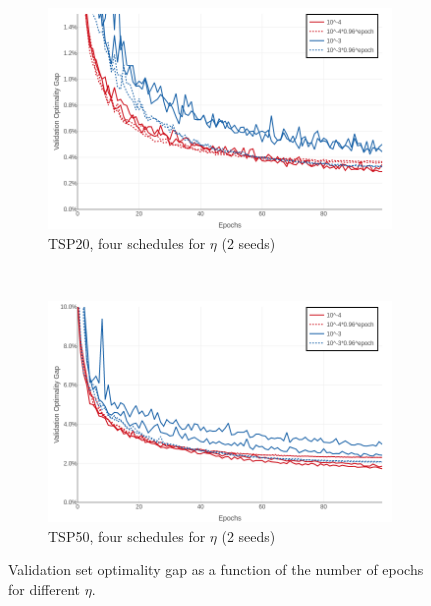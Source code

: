\begin{figure}
    \centering
    \begin{subfigure}[b]{0.49\linewidth}
        \centerline{\includegraphics[trim={0 0 0 0},clip,width=\linewidth]{./images/tsp20_learnrates}}
\caption{TSP20, four schedules for $\eta$ (2 seeds)}
\label{fig:tsp20_learnrates}
    \end{subfigure}
    ~
    \begin{subfigure}[b]{0.49\linewidth}
        \centerline{\includegraphics[trim={0 0 0 0},clip,width=\linewidth]{./images/tsp50_learnrates}}
\caption{TSP50, four schedules for $\eta$ (2 seeds)}
\label{fig:tsp50_learnrates}
    \end{subfigure}
    \caption{Validation set optimality gap as a function of the number of epochs for different $\eta$.}
    \label{fig:tsp_learnrates}
\end{figure}